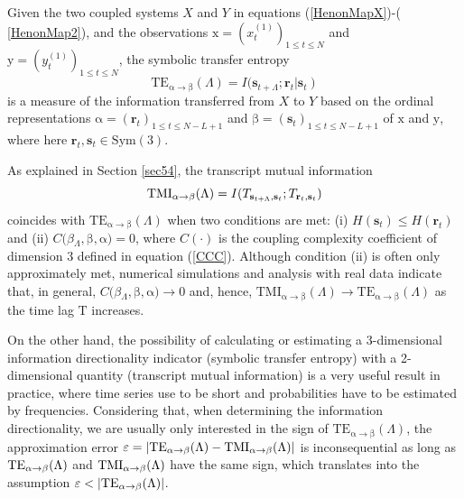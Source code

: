 \documentclass[%
 aip,
 amsmath,amssymb,
 reprint,%
]{revtex4-1}
\begin{document}
Given the two coupled systems $X$ and $Y$ in equations (\ref{HenonMapX})-(%
\ref{HenonMap2}), and the observations $\mathrm{x}=(x_{t}^{(1)})_{1\leq
t\leq N}$ and $\mathrm{y}=(y_{t}^{(1)})_{1\leq t\leq N}$, the symbolic
transfer entropy \cite{Staniek2008} 
\begin{equation}
\mathrm{TE}_{\mathrm{\alpha }\rightarrow \mathrm{\beta }}(\Lambda )=I(%
\mathbf{s}_{t+\Lambda };\mathbf{r}_{t}\left\vert \mathbf{s}_{t}\right)
\label{TE L=3}
\end{equation}%
is a measure of the information transferred from $X$ to $Y$ based on the
ordinal representations $\mathrm{\alpha }=(\mathbf{r}_{t})_{1\leq t\leq
N-L+1}$ and $\mathrm{\beta }=(\mathbf{s}_{t})_{1\leq t\leq N-L+1}$ of $%
\mathrm{x}$ and $\mathrm{y}$, where here $\mathbf{r}_{t},\mathbf{s}_{t}\in 
\mathrm{Sym}(3)$.

As explained in Section \ref{sec54}, the transcript mutual information
\begin{equation}
\mathrm{TMI}_{\mathrm{\alpha }\rightarrow \mathrm{\beta }}(\Lambda )=I(T_{%
\mathbf{s}_{t+\Lambda },\mathbf{s}_{t}};T_{\mathbf{r}_{t},\mathbf{s}_{t}})
\label{TMI L=3}
\end{equation}%
coincides with $\mathrm{TE}_{\mathrm{\alpha }\rightarrow \mathrm{\beta }%
}(\Lambda )$ when two conditions are met: (i) $H(\mathbf{s}_{t})\leq H(\mathbf{r}%
_{t})$ and (ii) $C($\textrm{$\beta $}$_{\Lambda },\mathrm{\beta },\mathrm{\alpha })=0$, where $C(\cdot )$ is the coupling complexity coefficient of dimension
3 defined in equation (\ref{CCC}). Although condition (ii) is often only approximately met, numerical simulations and analysis with real data indicate that, in general, $C($\textrm{$\beta $}$_{\Lambda },\mathrm{\beta },\mathrm{\alpha }) \to 0$ and, hence, $\mathrm{TMI}_{\mathrm{\alpha }\rightarrow \mathrm{\beta }}(\Lambda ) \to \mathrm{TE}_{\mathrm{\alpha }\rightarrow \mathrm{\beta }}(\Lambda )$ as the time lag $\textrm{T}$ increases.

On the other hand, the possibility of calculating or
estimating a 3-dimensional information directionality indicator (symbolic
transfer entropy) with a 2-dimensional quantity (transcript mutual
information) is a very useful result in practice, where time series use to
be short and probabilities have to be estimated by frequencies. Considering
that, when determining the information directionality, we are usually only interested
in the sign of $\mathrm{TE}_{\mathrm{\alpha }\rightarrow \mathrm{\beta }%
}(\Lambda )$, the approximation error $\varepsilon =\left\vert \mathrm{TE}_{%
\mathrm{\alpha }\rightarrow \mathrm{\beta }}(\Lambda )-\mathrm{TMI}_{\mathrm{%
\alpha }\rightarrow \mathrm{\beta }}(\Lambda )\right\vert $ is
inconsequential as long as $\mathrm{TE}_{\mathrm{\alpha }\rightarrow \mathrm{%
\beta }}(\Lambda )$ and $\mathrm{TMI}_{\mathrm{\alpha }\rightarrow \mathrm{%
\beta }}(\Lambda )$ have the same sign, which translates into the assumption 
$\varepsilon <\left\vert \mathrm{TE}_{\mathrm{\alpha }\rightarrow \mathrm{%
\beta }}(\Lambda )\right\vert $.
\end{document}
